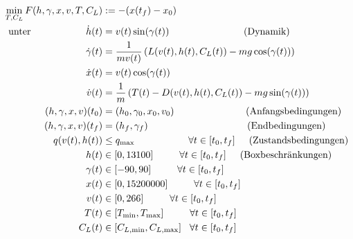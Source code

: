 \[\begin{split}
\min_{T, C_L} F(h,\gamma,x,v,T,C_L) &:= -(x(t_f) - x_0) \\\
\text{unter} \hspace{20mm} \dot{h}(t) &= v(t) \sin(\gamma(t)) \hspace{27mm} \text{(Dynamik)} \\\
\dot{\gamma}(t) &=  \dfrac{1}{mv(t)} \left( L(v(t),h(t),C_L(t)) - mg \cos(\gamma(t)) \right) \\\
\dot{x}(t) &= v(t) \cos(\gamma(t))\\\
\dot{v}(t) &= \dfrac{1}{m} \left( T(t) - D(v(t),h(t),C_L(t)) - mg \sin(\gamma(t)) \right) \\\
%
(h,\gamma,x,v)(t_0) &= (h_0,\gamma_0,x_0,v_0) \hspace{26mm} \text{(Anfangsbedingungen)}\\\
(h,\gamma,x,v)(t_f) &= (h_f,\gamma_f) \hspace{36mm} \text{(Endbedingungen)}\\\
%
q(v(t),h(t)) &\leq q_{\max} \hspace{19.5mm} \forall t \in [t_0,t_f] \hspace{5mm} \text{(Zustandsbedingungen)}\\\
h(t) &\in [0,13100] \hspace{9.5mm} \forall t \in [t_0,t_f] \hspace{5mm} \text{(Boxbeschränkungen)}\\\
\gamma(t) &\in [-90,90] \hspace{9.5mm} \forall t \in [t_0,t_f]\\\
x(t) &\in [0,15200000] \hspace{9.5mm} \forall t \in [t_0,t_f]\\\
v(t) &\in [0,266] \hspace{9.5mm} \forall t \in [t_0,t_f]\\\
T(t) &\in [T_{\min},T_{\max}] \hspace{9.5mm} \forall t \in [t_0,t_f]\\\
C_L(t) &\in [C_{L, \min},C_{L, \max}] \hspace{3mm} \forall t \in [t_0,t_f]
\end{split} \]

